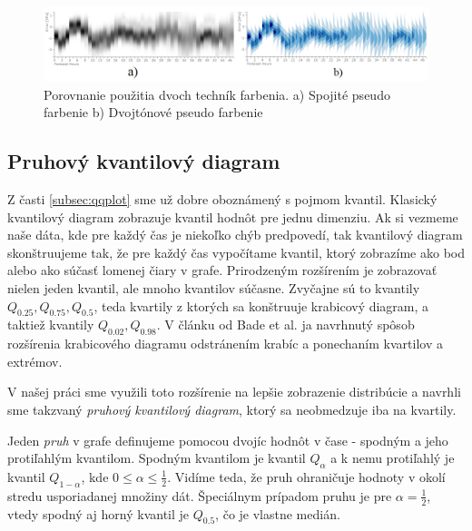 \begin{figure}
	\centering
	\hspace*{-0.8in}
	\includegraphics[width = 7.5in]{densitycompare}
	\caption{Porovnanie použitia dvoch techník farbenia. a) Spojité pseudo farbenie b) Dvojtónové pseudo farbenie }
	\label{fig:densitycompare} 
\end{figure}

\subsection{Pruhový kvantilový diagram} 
Z časti \ref{subsec:qqplot} sme už dobre oboznámený s pojmom kvantil. Klasický kvantilový diagram zobrazuje kvantil hodnôt pre jednu dimenziu. Ak si vezmeme naše dáta, kde pre každý čas je niekoľko chýb predpovedí, tak kvantilový diagram skonštruujeme tak, že pre každý čas vypočítame kvantil, ktorý zobrazíme ako bod alebo ako súčasť lomenej čiary v grafe.
Prirodzeným rozšírením je zobrazovať nielen jeden kvantil, ale mnoho kvantilov súčasne. Zvyčajne sú to kvantily $Q_{0.25}, Q_{0.75}, Q_{0.5} $, teda kvartily z ktorých sa konštruuje krabicový diagram, a taktiež kvantily $ Q_{0.02}, Q_{0.98} $. V článku od Bade et al. \cite{Bade} ja navrhnutý spôsob rozšírenia krabicového diagramu odstránením krabíc a ponechaním kvartilov a extrémov.

V našej práci sme využili toto rozšírenie na lepšie zobrazenie distribúcie a navrhli sme takzvaný \textit{pruhový kvantilový diagram}, ktorý sa neobmedzuje iba na kvartily.

Jeden \textit{pruh} v grafe definujeme pomocou dvojíc hodnôt v čase - spodným a jeho protiľahlým kvantilom. Spodným kvantilom je kvantil $ Q_{\alpha} $ a k nemu protiľahlý je kvantil $ Q_{1 - \alpha} $, kde $ 0 \leq \alpha \leq \frac{1}{2} $. Vidíme teda, že pruh ohraničuje hodnoty v okolí stredu usporiadanej množiny dát. Špeciálnym prípadom pruhu je pre $ \alpha = \frac{1}{2} $, vtedy spodný aj horný kvantil je $ Q_{0.5} $, čo je vlastne medián.

